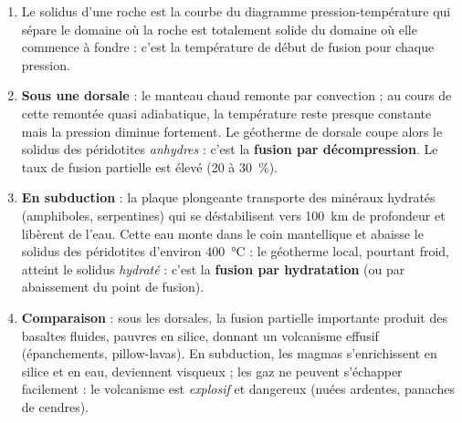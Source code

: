 \documentclass[11pt]{article}
\newcommand{\cle}[1]{{\popxbold\color{popdark}#1}}
\begin{document}
\begin{corrige}
\begin{enumerate}
\item Le \cle{solidus} d'une roche est la courbe du diagramme pression-température qui sépare le domaine où la roche est totalement solide du domaine où elle commence à fondre : c'est la température de début de fusion pour chaque pression.
\item \textbf{Sous une dorsale} : le manteau chaud remonte par convection ; au cours de cette remontée quasi adiabatique, la température reste presque constante mais la \cle{pression diminue fortement}. Le géotherme de dorsale coupe alors le solidus des péridotites \emph{anhydres} : c'est la \textbf{fusion par décompression}. Le taux de fusion partielle est élevé (20 à \SI{30}{\percent}).
\item \textbf{En subduction} : la plaque plongeante transporte des minéraux hydratés (amphiboles, serpentines) qui se déstabilisent vers \SI{100}{km} de profondeur et libèrent de l'eau. Cette eau monte dans le coin mantellique et abaisse le solidus des péridotites d'environ \SI{400}{\celsius} : le géotherme local, pourtant froid, atteint le solidus \emph{hydraté} : c'est la \textbf{fusion par hydratation} (ou par abaissement du point de fusion).
\item \textbf{Comparaison} : sous les dorsales, la fusion partielle importante produit des \cle{basaltes fluides}, pauvres en silice, donnant un volcanisme effusif (épanchements, pillow-lavas). En subduction, les magmas s'enrichissent en silice et en eau, deviennent \cle{visqueux} ; les gaz ne peuvent s'échapper facilement : le volcanisme est \emph{explosif} et dangereux (nuées ardentes, panaches de cendres).
\end{enumerate}
\end{corrige}
\end{document}
